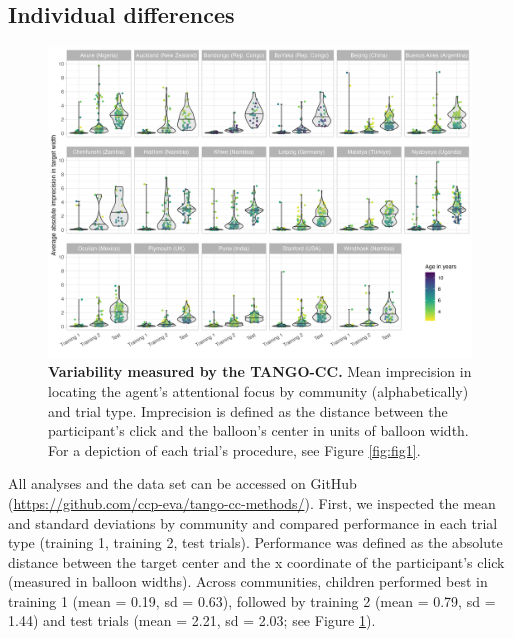 \documentclass[
  man,floatsintext]{apa7}
\begin{document}
\subsection{Individual differences}\label{individual-differences}



\begin{figure}

{\centering \includegraphics[width=1\linewidth]{../figures/tango-cc-variability} 

}

\caption{\textbf{Variability measured by the TANGO-CC.} Mean imprecision in locating the agent's attentional focus by community (alphabetically) and trial type. Imprecision is defined as the distance between the participant's click and the balloon's center in units of balloon width. For a depiction of each trial's procedure, see Figure \ref{fig:fig1}.}\label{fig:fig3}
\end{figure}

All analyses and the data set can be accessed on GitHub (\url{https://github.com/ccp-eva/tango-cc-methods/}).
First, we inspected the mean and standard deviations by community and compared performance in each trial type (training 1, training 2, test trials).
Performance was defined as the absolute distance between the target center and the x coordinate of the participant's click (measured in balloon widths).
Across communities, children performed best in training 1 (mean = 0.19, sd = 0.63), followed by training 2 (mean = 0.79, sd = 1.44) and test trials (mean = 2.21, sd = 2.03; see Figure \ref{fig:fig3}).
\end{document}
